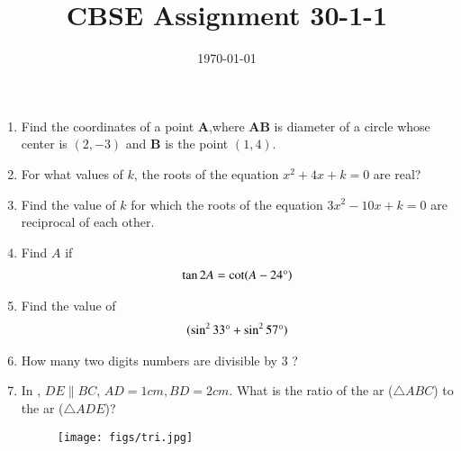 \documentclass[12pt,-letter paper]{article}
\title{CBSE Assignment 30-1-1}
\date{\today}
\let\vec\mathbf{}
\let\vec\mathbf{}
\let\vec\mathbf{}
\providecommand{\brak}[1]{\ensuremath{\left(#1\right)}}\graphicspath{{/storage/self/primary/Download/latexnew/fig}}
\begin{document}
\maketitle{}
\begin{enumerate} 
\item Find the coordinates of a point $\vec{A}$,where $\vec{AB}$ is diameter of a circle whose center is $\brak{2,-3}$ and $\vec{B}$ is the point $\brak{1,4}$.
\item For what values of $k$, the roots of the equation  $ x^2+4x+k = 0  $ are real?


\item Find the value of $k$ for which the roots of the equation  $ 3x^2-10x+k=0  $ are reciprocal of each other.
\item Find $A$ if \begin{align*}\tan 2A = \cot (A-24\degree)\end{align*}
\item Find the value of \begin{align*}(\sin^2 33\degree+ \sin^2 57\degree)\end{align*}
\item How many two digits numbers are divisible by $3$ ?
\item In , $DE \parallel BC$, $ AD = 1 cm , BD = 2 cm$. What is the ratio of the ar ($\triangle ABC$) to  the 
  ar ($\triangle ADE$)?
		\begin{figure}[H]
			\centering
			\texttt{[image: figs/tri.jpg]}
			\caption{}
			\label{fig:figure1}
			

\end{figure}
\end{enumerate}
\end{document}
